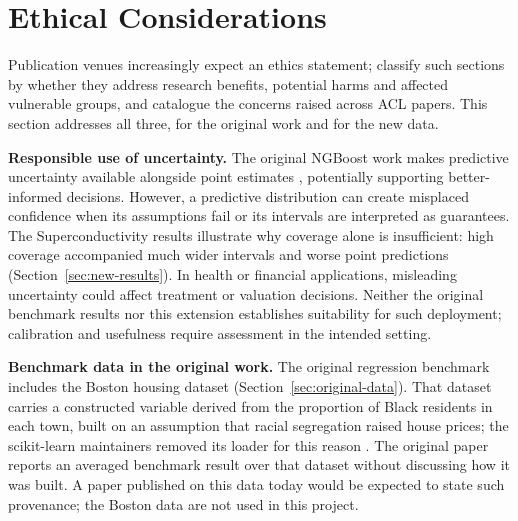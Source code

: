 \section{Ethical Considerations}
\label{sec:ethics}

Publication venues increasingly expect an ethics statement; \citet{benotti-blackburn-2022-ethics} classify such sections by whether they address research benefits, potential harms and affected vulnerable groups, and \citet{karamolegkou-etal-2025-ethical} catalogue the concerns raised across ACL papers.
This section addresses all three, for the original work and for the new data.

\textbf{Responsible use of uncertainty.}
The original NGBoost work makes predictive uncertainty available alongside point estimates \cite{duan2020ngboost}, potentially supporting better-informed decisions.
However, a predictive distribution can create misplaced confidence when its assumptions fail or its intervals are interpreted as guarantees.
The Superconductivity results illustrate why coverage alone is insufficient: high coverage accompanied much wider intervals and worse point predictions (Section~\ref{sec:new-results}).
In health or financial applications, misleading uncertainty could affect treatment or valuation decisions.
Neither the original benchmark results nor this extension establishes suitability for such deployment; calibration and usefulness require assessment in the intended setting.

\textbf{Benchmark data in the original work.}
The original regression benchmark includes the Boston housing dataset (Section~\ref{sec:original-data}).
That dataset carries a constructed variable derived from the proportion of Black residents in each town, built on an assumption that racial segregation raised house prices; the scikit-learn maintainers removed its loader for this reason \cite{sklearnboston}.
The original paper reports an averaged benchmark result over that dataset without discussing how it was built.
A paper published on this data today would be expected to state such provenance; the Boston data are not used in this project.

